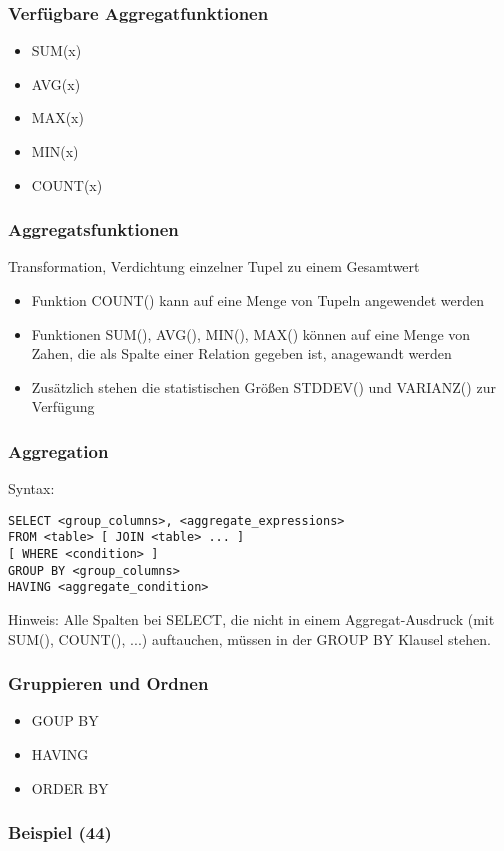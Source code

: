 \subsubsection{Verfügbare Aggregatfunktionen}
\begin{itemize}
	\item SUM(x)
	\item AVG(x)
	\item MAX(x)
	\item MIN(x)
	\item COUNT(x)
\end{itemize}
\subsubsection{Aggregatsfunktionen}
Transformation, Verdichtung einzelner Tupel zu einem Gesamtwert
\begin{itemize}
	\item Funktion COUNT() kann auf eine Menge von Tupeln angewendet werden
	\item Funktionen SUM(), AVG(), MIN(), MAX() können auf eine Menge von Zahen, die als Spalte einer Relation gegeben ist, anagewandt werden
	\item Zusätzlich stehen die statistischen Größen STDDEV() und VARIANZ() zur Verfügung
\end{itemize}
\subsubsection{Aggregation}
Syntax: 
\begin{lstlisting}
SELECT <group_columns>, <aggregate_expressions>
FROM <table> [ JOIN <table> ... ]
[ WHERE <condition> ]
GROUP BY <group_columns>
HAVING <aggregate_condition>
\end{lstlisting}
Hinweis: Alle Spalten bei SELECT, die nicht in einem Aggregat-Ausdruck (mit SUM(), COUNT(), ...) auftauchen, müssen in der GROUP BY Klausel stehen.
\subsubsection{Gruppieren und Ordnen}
\begin{itemize}
	\item GOUP BY
	\item HAVING
	\item ORDER BY
\end{itemize}
\subsubsection{Beispiel (44)}
